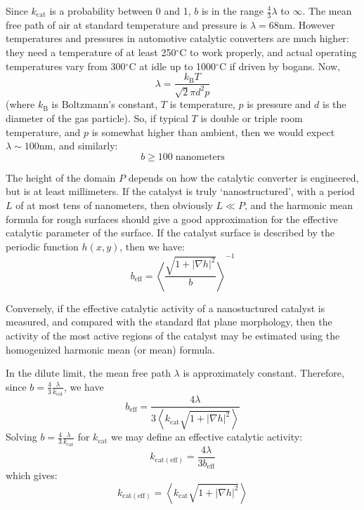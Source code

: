 \documentclass[12pt, a4paper, twoside, openright]{book}
\newcommand{\beff}{\ensuremath{b_{\mathrm{eff}}}}
\newcommand{\kcat}{\ensuremath{k_{\mathrm{cat}}}}
\begin{document}
\vspace*{1em}
Since $\kcat$ is a probability between 0 and 1, $b$ is in the range $\frac{4}{3}\lambda$ to $\infty$. The mean free path of air at standard temperature and pressure is $\lambda = 68$nm.  However temperatures and pressures in automotive catalytic converters are much higher: they need a temperature of at least 250$^{\circ}$C to work properly, and actual operating temperatures vary from 300$^{\circ}$C at idle up to 1000$^{\circ}$C if driven by bogans. Now,
\begin{equation}
\lambda = \frac{k_{\mathrm{B}} T}{\sqrt{2} \pi d^2 p}
\end{equation}
(where $k_{\mathrm{B}}$ is Boltzmann's constant, $T$ is temperature, $p$ is pressure and $d$ is the diameter of the gas particle).
So, if typical $T$ is double or triple room temperature, and $p$ is somewhat higher than ambient, then we would expect $\lambda \sim 100$nm, and similarly:
\begin{equation}
b \geq 100 \;\text{nanometers}
\end{equation}

The height of the domain $P$ depends on how the catalytic converter is engineered, but is at least millimeters.  If the catalyst is truly `nanostructured', with a period $L$ of at most tens of nanometers, then obviously $L \ll P$, and the harmonic mean formula for rough surfaces should give a good approximation for the effective catalytic parameter of the surface.  If the catalyst surface is described by the periodic function $h(x,y)$, then we have:
\begin{equation}
\beff = \left< \frac{ \sqrt{1+|\nabla h|^2} }{b} \right>^{-1}
\end{equation}

Conversely, if the effective catalytic activity of a nanostuctured catalyst is measured, and compared with the standard flat plane morphology, then the activity of the most active regions of the catalyst may be estimated using the homogenized harmonic mean (or mean) formula.

\vspace*{1em}
In the dilute limit, the mean free path $\lambda$ is approximately constant.  Therefore, since $ b = \frac{4}{3} \frac{\lambda}{\kcat} $, we have
\begin{equation}
\beff = \frac{4 \lambda}{ 3 \left< \kcat \sqrt{1+|\nabla h|^2} \right> }
\end{equation}
Solving $ b = \frac{4}{3} \frac{\lambda}{\kcat} $ for $\kcat$ we may define an effective catalytic activity:
\begin{equation}
k_{\mathrm{cat (eff)}} = \frac{4 \lambda}{3 \beff}
\end{equation}
which gives:
\begin{equation}
k_{\mathrm{cat (eff)}} = \left< \kcat \sqrt{1+|\nabla h|^2} \right>
\end{equation}
\end{document}
